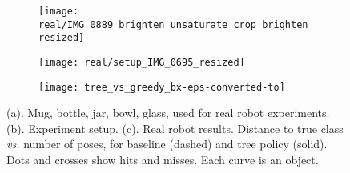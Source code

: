 \documentclass[letterpaper, 10 pt, conference]{ieeeconf}  %
\begin{document}
\begin{figure*}[thb]
  \begin{center}
    \begin{subfigure}{.38\textwidth}
      \texttt{[image: real/IMG\_0889\_brighten\_unsaturate\_crop\_brighten\_resized]}  %
      \caption{}
      \label{fig:real_objs}
    \end{subfigure}
    \begin{subfigure}{.28\textwidth}
      \texttt{[image: real/setup\_IMG\_0695\_resized]}
      \caption{}
      \label{fig:real_setup}
    \end{subfigure}
    \begin{subfigure}{.32\textwidth}
      \texttt{[image: tree\_vs\_greedy\_bx-eps-converted-to]}
      \vspace{-7mm}
      \caption{}
      \label{fig:real_tree_vs_greedy}
    \end{subfigure}
  \end{center}
  \vspace{-7mm}
  \caption{(a). Mug, bottle, jar, bowl, glass, used for real robot experiments. (b). Experiment setup. (c). Real robot results. Distance to true class \textit{vs.} number of poses, for baseline (dashed) and tree policy (solid). Dots and crosses show hits and misses. Each curve is an object.}
  \vspace{-5mm}
\end{figure*}
\end{document}

